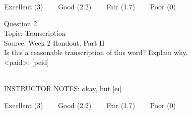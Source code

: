 \documentclass[12pt]{article}
\begin{document}
\vfill
Excellent (3) ~~~ Good (2.2) ~~~ Fair (1.7) ~~~ Poor (0)
\newpage

{\large Question 2}\\

Topic: Transcription\\
Source: Week 2 Handout, Part II\\

Is this a reasonable transcription of this word? Explain why.\\

<paid>: {[peid]}


~\\
INSTRUCTOR NOTES: okay, but [eɪ]


\vfill
Excellent (3) ~~~ Good (2.2) ~~~ Fair (1.7) ~~~ Poor (0)
\newpage

\begin{center}
\textbf{{\color{red}{\HUGE END OF EXAM}}}\\

\end{center}
\newpage

\begin{center}
\textbf{{\color{blue}{\HUGE START OF EXAM\\}}}

\textbf{{\color{blue}{\HUGE Student ID: empty\\}}}

\textbf{{\color{blue}{\HUGE 9:20\\}}}

\end{center}
\newpage

\begin{center}
\textbf{{\color{blue}{\HUGE START OF EXAM\\}}}

\textbf{{\color{blue}{\HUGE Student ID: empty\\}}}

\textbf{{\color{blue}{\HUGE 9:30\\}}}

\end{center}
\newpage

\begin{center}
\textbf{{\color{blue}{\HUGE START OF EXAM\\}}}

\textbf{{\color{blue}{\HUGE Student ID: 83639\\}}}

\textbf{{\color{blue}{\HUGE 9:40\\}}}

\end{center}
\newpage
\end{document}
